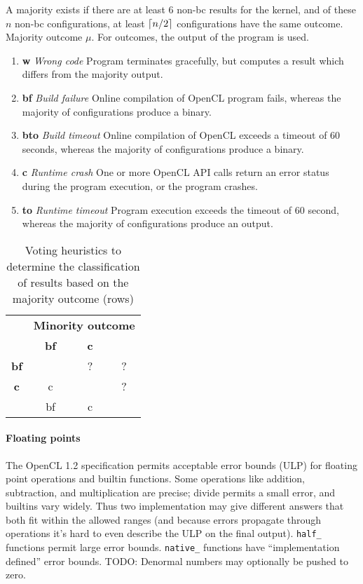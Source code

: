A majority exists if there are at least 6 non-bc results for the kernel, and of these $n$ non-bc configurations, at least $\lceil n/2\rceil$ configurations have the same outcome. Majority outcome $\mu$. For \cmark outcomes, the output of the program is used.

%
\begin{enumerate}
	\item \textbf{w} \emph{Wrong code} Program terminates gracefully, but computes a result which differs from the majority output.
	\item \textbf{bf} \emph{Build failure} Online compilation of OpenCL program fails, whereas the majority of configurations produce a binary.
	\item \textbf{bto} \emph{Build timeout} Online compilation of OpenCL exceeds a timeout of 60 seconds, whereas the majority of configurations produce a binary.
	\item \textbf{c} \emph{Runtime crash} One or more OpenCL API calls return an error status during the program execution, or the program crashes.
	\item \textbf{to} \emph{Runtime timeout} Program execution exceeds the timeout of 60 second, whereas the majority of configurations produce an output.
\end{enumerate}


\begin{table}
	\scriptsize %
	\centering %
	\begin{tabular}{ c|ccc }
		\toprule
		 & \multicolumn{3}{c}{\textbf{Minority outcome}} \\
		 & \textbf{bf} & \textbf{c} & \textbf{\cmark} \\
		\midrule
		\textbf{bf} & \cmark & ? & ? \\
		\textbf{c} & c & \cmark & ? \\
		\textbf{\cmark} & bf & c & \cmark \\
		\bottomrule
	\end{tabular}
	\caption{Voting heuristics to determine the classification of results based on the majority outcome (rows) }
	\label{tab:voting-heuristics}
\end{table}

\paragraph{Floating points} The OpenCL 1.2 specification permits acceptable error bounds (ULP) for floating point operations and builtin functions. Some operations like addition, subtraction, and multiplication are precise; divide permits a small error, and builtins vary widely. Thus two implementation may give different answers that both fit within the allowed ranges (and because errors propagate through operations it's hard to even describe the ULP on the final output). \texttt{half\_} functions permit large error bounds. \texttt{native\_} functions have ``implementation defined'' error bounds. TODO: Denormal numbers may optionally be pushed to zero.

